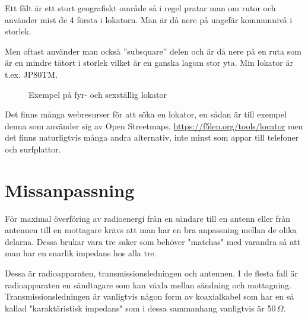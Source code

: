 Ett fält är ett stort geografiskt område så i regel pratar man om rutor och
använder mist de 4 första i lokatorn. Man är då nere på ungefär kommunnivå i
storlek.

Men oftast använder man också ''subsquare'' delen och är då nere på en ruta
som är en mindre tätort i storlek vilket är en ganska lagom stor yta. Min
lokator är t.ex. JP80TM.

\begin{figure}[H]
	\centering
	\qquad
	\caption{Exempel på fyr- och sexställig lokator}
\end{figure}

Det finns många webresurser för att söka en lokator, en sådan är till exempel
denna som använder sig av Open Streetmaps,
\url{https://f5len.org/tools/locator} men det finns naturligtvis många andra
alternativ, inte minst som appar till telefoner och surfplattor.

\section{Missanpassning}

För maximal överföring av radioenergi från en sändare till en antenn eller
från antennen till en mottagare krävs att man har en bra anpassning mellan de
olika delarna. Dessa brukar vara tre saker som behöver "matchas" med varandra
så att man har en snarlik impedans hos alla tre.

Dessa är radioapparaten, transmissionsledningen och antennen. I de flesta fall
är radioapparaten en sändtagare som kan växla mellan sändning och mottagning.
Transmissionsledningen är vanligtvis någon form av koaxialkabel som har en så
kallad "karaktäristisk impedans" som i dessa sammanhang vanligtvis är
50\,$\Omega$.

